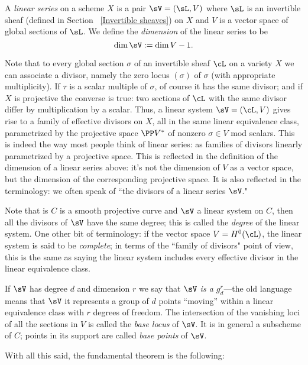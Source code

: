 \begin{definition}
 A \emph{linear series} on a scheme $X$ is a pair $\sV  = (\sL, V)$ where $\sL$ is an invertible sheaf (defined in Section ~\ref{Invertible sheaves}) on $X$ and
 $V$ is a vector space of global sections of $\sL$. We define the \emph{dimension} of the linear series to be 
 $$
 \dim \sV := \dim V -1.
 $$
 
 Note that to every global section $\sigma$ of an invertible sheaf $\cL$ on a variety $X$  we can associate a divisor, namely the zero locus $(\sigma)$ of $\sigma$ (with appropriate multiplicity). If $\tau$ is a scalar multiple of $\sigma$, of course it has the same divisor; and if $X$ is projective the converse is true: two sections of $\cL$ with the same divisor differ by multiplication by a scalar. Thus, a linear system $\sV = (\cL, V)$ gives rise to a family of effective divisors on $X$, all in the same linear equivalence class, parametrized by the projective space $\PP V^*$ of nonzero $\sigma \in V$ mod scalars. This is indeed the way most people think of linear series: as families of divisors linearly parametrized by a projective space. This is reflected in the definition of the dimension of a linear series above: it's not the dimension of $V$ as a vector space, but the dimension of the corresponding projective space. It is also reflected in the terminology: we often speak of ``the divisors of a linear series $\sV$." 
 
 Note that is $C$ is a smooth projective curve and $\sV$ a linear system on $C$, then all the divisors of $\sV$ have the same degree; this is called the \emph{degree} of the linear system. One other bit of terminology: if the vector space $V = H^0(\cL)$, the linear system is said to be \emph{complete}; in terms of the ``family of divisors" point of view, this is the same as saying the linear system includes every effective divisor in the linear equivalence class.
 
If $\sV$ has degree $d$ and dimension $r$ we say that \emph{$\sV$ is a $g^r_d$}---the old language means that $\sV$ it represents a group of $d$ points ``moving'' within a linear equivalence class with $r$ degrees of freedom.  The intersection of the vanishing loci of all the sections in $V$ is called the \emph{base locus} of $\sV$. It is in general a subscheme of $C$; points in its support are called \emph{base points} of $\sV$. 
 \end{definition}

With all this said, the fundamental theorem is the following:

